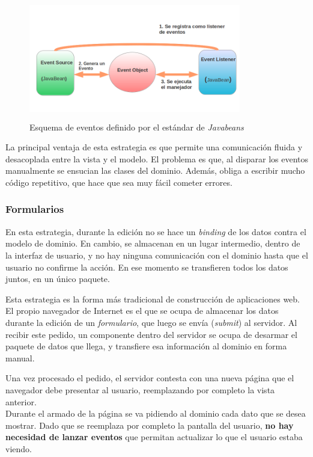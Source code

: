 	
	 \begin{figure}[h]
	 	\centering
		\includegraphics[width=350px, height=200px]{img/javabeans}
		\caption{Esquema de eventos definido por el estándar de \emph{Javabeans}}
		\label{javabeans}
	\end{figure}

	La principal ventaja de esta estrategia es que
	permite una comunicación fluida y desacoplada entre la vista y el modelo.
	El problema es que, al disparar los eventos \\
	manualmente se ensucian las
	clases del dominio. Además, obliga a escribir mucho código repetitivo, que hace que
	sea muy fácil cometer errores.

\subsubsection{Formularios}

	En esta estrategia, durante la edición no se hace un \emph{binding} de los
	datos contra el modelo de dominio. En cambio, se almacenan en un lugar
	intermedio, dentro de la interfaz de usuario, y no hay ninguna comunicación
	con el dominio hasta que el usuario no confirme la acción. En ese momento se
	transfieren todos los datos juntos, en un único paquete.
	
	Esta estrategia es la forma más tradicional de construcción de aplicaciones
	web. El propio navegador de Internet es el que se ocupa de almacenar los
	datos durante la edición de un \emph{formulario}, que luego se envía
	(\emph{submit}) al servidor. 
	Al recibir este pedido, un componente dentro del servidor se ocupa de desarmar
	el paquete de datos que llega, y transfiere esa información al dominio en forma
	manual.
	
	Una vez procesado el pedido, el servidor contesta con una nueva página que
	el \\ navegador debe presentar al usuario, reemplazando por completo la vista
	anterior.\\
	Durante el armado de la página se va pidiendo al dominio cada dato que se desea
	mostrar. Dado que se reemplaza por completo la pantalla del usuario, \textbf{no
	hay necesidad de lanzar eventos} que permitan actualizar lo que el usuario
	estaba viendo.
	

